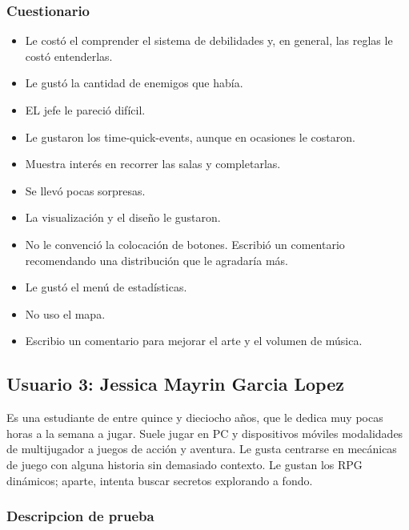 \subsubsection{Cuestionario}
\begin{itemize}
    \item Le costó el comprender el sistema de debilidades y, en general, las reglas le costó entenderlas.

    \item Le gustó la cantidad de enemigos que había.

\item EL jefe le pareció difícil.

\item Le gustaron los time-quick-events, aunque en ocasiones le costaron.

\item Muestra interés en recorrer las salas y completarlas.

\item Se llevó pocas sorpresas.

\item La visualización y el diseño le gustaron.

\item No le convenció la colocación de botones. Escribió un comentario recomendando una distribución que le agradaría más.

\item Le gustó el menú de estadísticas.

\item No uso el mapa.

\item Escribio un comentario para mejorar el arte y el volumen de música.
\end{itemize}


\subsection{Usuario 3: Jessica Mayrin Garcia Lopez}

Es una estudiante de entre quince y dieciocho años, que le dedica muy pocas horas a la semana a jugar. Suele jugar en PC y dispositivos móviles modalidades de multijugador a juegos de acción y aventura. Le gusta centrarse en mecánicas de juego con alguna historia sin demasiado contexto. Le gustan los RPG dinámicos; aparte, intenta buscar secretos explorando a fondo.

\subsubsection{Descripcion de prueba}


